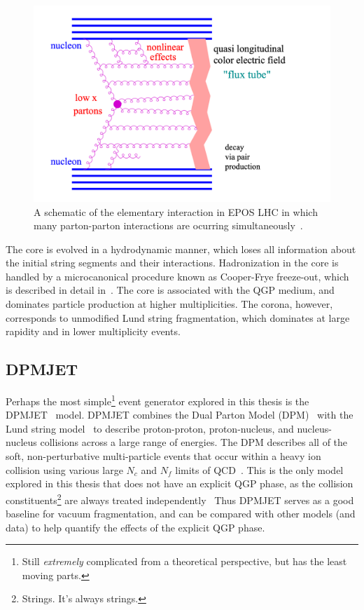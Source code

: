 \begin{figure}[ht]
    \centering
    \includegraphics[width=0.5\linewidth]{figures/introduction/epos_interaction.png}
    \caption{A schematic of the elementary interaction in EPOS LHC in which many parton-parton interactions are ocurring simultaneously~\cite{EPOSLHC}.}
    \label{fig:parton_ladder}
\end{figure}

The core is evolved in a hydrodynamic manner, which loses all information about the initial string segments and their interactions. Hadronization in the core is handled by a microcanonical procedure known as Cooper-Frye freeze-out, which is described in detail in~\cite{CooperFrye}. The core is associated with the QGP medium, and dominates particle production at higher multiplicities. The corona, however, corresponds to unmodified Lund string fragmentation, which dominates at large rapidity and in lower multiplicity events. 

\subsection{DPMJET}

Perhaps the most simple\footnote{Still \textit{extremely} complicated from a theoretical perspective, but has the least moving parts.} event generator explored in this thesis is the DPMJET~\cite{DPMJET} model. DPMJET combines the Dual Parton Model (DPM)~\cite{DPM} with the Lund string model~\cite{LundString} to describe proton-proton, proton-nucleus, and nucleus-nucleus collisions across a large range of energies. The DPM describes all of the soft, non-perturbative multi-particle events that occur within a heavy ion collision using various large $N_c$ and $N_f$ limits of QCD~\cite{}. This is the only model explored in this thesis that does not have an explicit QGP phase, as the collision constituents\footnote{Strings. It's always strings.} are always treated independently~\cite{} Thus DPMJET serves as a good baseline for vacuum fragmentation, and can be compared with other models (and data) to help quantify the effects of the explicit QGP phase.